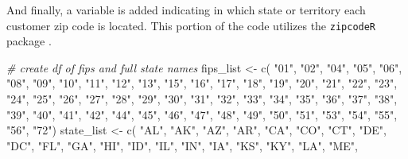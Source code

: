 \documentclass[
]{book}
\newenvironment{Shaded}{\begin{snugshade}}{\end{snugshade}}
\newcommand{\CommentTok}[1]{\textcolor[rgb]{0.56,0.35,0.01}{\textit{#1}}}
\newcommand{\FunctionTok}[1]{\textcolor[rgb]{0.00,0.00,0.00}{#1}}
\newcommand{\NormalTok}[1]{#1}
\newcommand{\OtherTok}[1]{\textcolor[rgb]{0.56,0.35,0.01}{#1}}
\newcommand{\StringTok}[1]{\textcolor[rgb]{0.31,0.60,0.02}{#1}}
\begin{document}
And finally, a variable is added indicating in which state or territory each customer zip code is located. This portion of the code utilizes the \texttt{zipcodeR} package \citep{R-zipcodeR}.

\begin{Shaded}
\begin{Highlighting}[]
\CommentTok{\# create df of fips and full state names}
\NormalTok{fips\_list }\OtherTok{\textless{}{-}} \FunctionTok{c}\NormalTok{(}
  \StringTok{"01"}\NormalTok{, }\StringTok{"02"}\NormalTok{, }\StringTok{"04"}\NormalTok{, }\StringTok{"05"}\NormalTok{, }\StringTok{"06"}\NormalTok{, }\StringTok{"08"}\NormalTok{, }\StringTok{"09"}\NormalTok{, }\StringTok{"10"}\NormalTok{, }\StringTok{"11"}\NormalTok{, }\StringTok{"12"}\NormalTok{, }
  \StringTok{"13"}\NormalTok{, }\StringTok{"15"}\NormalTok{, }\StringTok{"16"}\NormalTok{, }\StringTok{"17"}\NormalTok{, }\StringTok{"18"}\NormalTok{, }\StringTok{"19"}\NormalTok{, }\StringTok{"20"}\NormalTok{, }\StringTok{"21"}\NormalTok{, }\StringTok{"22"}\NormalTok{, }\StringTok{"23"}\NormalTok{, }
  \StringTok{"24"}\NormalTok{, }\StringTok{"25"}\NormalTok{, }\StringTok{"26"}\NormalTok{, }\StringTok{"27"}\NormalTok{, }\StringTok{"28"}\NormalTok{, }\StringTok{"29"}\NormalTok{, }\StringTok{"30"}\NormalTok{, }\StringTok{"31"}\NormalTok{, }\StringTok{"32"}\NormalTok{, }\StringTok{"33"}\NormalTok{, }
  \StringTok{"34"}\NormalTok{, }\StringTok{"35"}\NormalTok{, }\StringTok{"36"}\NormalTok{, }\StringTok{"37"}\NormalTok{, }\StringTok{"38"}\NormalTok{, }\StringTok{"39"}\NormalTok{, }\StringTok{"40"}\NormalTok{, }\StringTok{"41"}\NormalTok{, }\StringTok{"42"}\NormalTok{, }\StringTok{"44"}\NormalTok{, }
  \StringTok{"45"}\NormalTok{, }\StringTok{"46"}\NormalTok{, }\StringTok{"47"}\NormalTok{, }\StringTok{"48"}\NormalTok{, }\StringTok{"49"}\NormalTok{, }\StringTok{"50"}\NormalTok{, }\StringTok{"51"}\NormalTok{, }\StringTok{"53"}\NormalTok{, }\StringTok{"54"}\NormalTok{, }\StringTok{"55"}\NormalTok{, }
  \StringTok{"56"}\NormalTok{, }\StringTok{"72"}\NormalTok{)}
\NormalTok{state\_list }\OtherTok{\textless{}{-}} \FunctionTok{c}\NormalTok{(}
  \StringTok{"AL"}\NormalTok{, }\StringTok{"AK"}\NormalTok{, }\StringTok{"AZ"}\NormalTok{, }\StringTok{"AR"}\NormalTok{, }\StringTok{"CA"}\NormalTok{, }\StringTok{"CO"}\NormalTok{, }\StringTok{"CT"}\NormalTok{, }\StringTok{"DE"}\NormalTok{, }\StringTok{"DC"}\NormalTok{, }\StringTok{"FL"}\NormalTok{,}
  \StringTok{"GA"}\NormalTok{, }\StringTok{"HI"}\NormalTok{, }\StringTok{"ID"}\NormalTok{, }\StringTok{"IL"}\NormalTok{, }\StringTok{"IN"}\NormalTok{, }\StringTok{"IA"}\NormalTok{, }\StringTok{"KS"}\NormalTok{, }\StringTok{"KY"}\NormalTok{, }\StringTok{"LA"}\NormalTok{, }\StringTok{"ME"}\NormalTok{,}

\end{Highlighting}
\end{Shaded}
\end{document}
